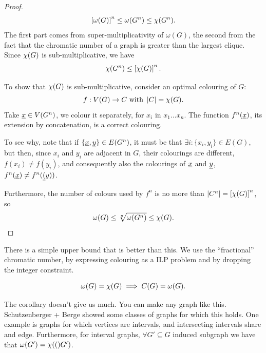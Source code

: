 \begin{proof}
	\begin{equation*}
		\left[ \omega(G) \right]^n \le \omega(G^n) \le \chi(G^n).
	\end{equation*}
	The first part comes from super-multiplicativity of $\omega(G)$, the second from the fact that the chromatic number of a graph is greater than the largest clique.
	Since $\chi(G)$ is sub-multiplicative, we have
	\begin{equation*}
		\chi(G^n) \le \left[ \chi(G) \right]^n.
	\end{equation*}

	To show that $\chi(G)$ is sub-multiplicative, consider an optimal colouring of $G$:
	\begin{equation*}
		f : V(G) \to C \text{ with } \left|{C}\right| = \chi(G).
	\end{equation*}
	Take $\underline{x} \in V(G^n)$, we colour it separately, for $x_i$ in $x_1 \dots x_n$.
	The function $f^n(\underline{x})$, \ie its extension by concatenation, is a correct colouring.

	To see why, note that if $\{\underline{x}, \underline{y}\} \in E(G^n)$, it must be that $\exists i : \{x_i, y_i\} \in E(G)$, but then, since $x_i$ and $y_i$ are adjacent in $G$, their colourings are different, \ie $f(x_i) \neq f(y_i)$, and consequently also the colourings of $\underline{x}$ and $\underline{y}$, \ie $f^n(\underline{x}) \neq f^n(\underline{(}y))$.

	Furthermore, the number of colours used by $f^n$ is no more than $\left|{C^n}\right| = \left[ \chi(G) \right]^n$, so
	\begin{equation*}
		\omega(G) \le \sqrt[n]{\omega(G^n)} \le \chi(G). \qedhere
	\end{equation*}
\end{proof}

There is a simple upper bound that is better than this.
We use the ``fractional'' chromatic number, by expressing colouring as a \ac{ILP} problem and by dropping the integer constraint.

\begin{cor}
	\begin{equation*}
		\omega(G) = \chi(G) \implies C(G) = \omega(G).
	\end{equation*}
\end{cor}

The corollary doesn't give us much.
You can make any graph like this.
Schutzenberger + Berge showed some classes of graphs for which this holds.
One example is graphs for which vertices are intervals, and intersecting intervals share and edge.
Furthermore, for interval graphs, $\forall G' \subseteq G$ induced subgraph we have that $\omega(G') = \chi(()G')$.

